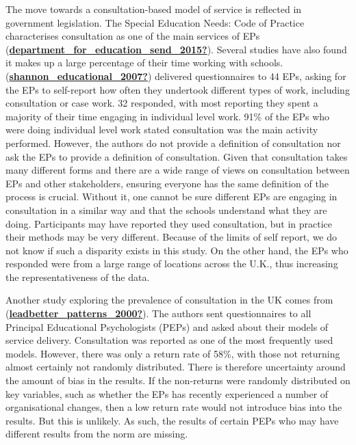 \documentclass[
]{article}
\begin{document}
The move towards a consultation-based model of service is reflected in
government legislation. The Special Education Needs: Code of Practice
characterises consultation as one of the main services of EPs
(\protect\hyperlink{ref-department_for_education_send_2015}{\textbf{department\_for\_education\_send\_2015?}}).
Several studies have also found it makes up a large percentage of their
time working with schools.
(\protect\hyperlink{ref-shannon_educational_2007}{\textbf{shannon\_educational\_2007?}})
delivered questionnaires to 44 EPs, asking for the EPs to self-report
how often they undertook different types of work, including consultation
or case work. 32 responded, with most reporting they spent a majority of
their time engaging in individual level work. 91\% of the EPs who were
doing individual level work stated consultation was the main activity
performed. However, the authors do not provide a definition of
consultation nor ask the EPs to provide a definition of consultation.
Given that consultation takes many different forms and there are a wide
range of views on consultation between EPs and other stakeholders,
ensuring everyone has the same definition of the process is crucial.
Without it, one cannot be sure different EPs are engaging in
consultation in a similar way and that the schools understand what they
are doing. Participants may have reported they used consultation, but in
practice their methods may be very different. Because of the limits of
self report, we do not know if such a disparity exists in this study. On
the other hand, the EPs who responded were from a large range of
locations across the U.K., thus increasing the representativeness of the
data.

Another study exploring the prevalence of consultation in the UK comes
from
(\protect\hyperlink{ref-leadbetter_patterns_2000}{\textbf{leadbetter\_patterns\_2000?}}).
The authors sent questionnaires to all Principal Educational
Psychologists (PEPs) and asked about their models of service delivery.
Consultation was reported as one of the most frequently used models.
However, there was only a return rate of 58\%, with those not returning
almost certainly not randomly distributed. There is therefore
uncertainty around the amount of bias in the results. If the non-returns
were randomly distributed on key variables, such as whether the EPs has
recently experienced a number of organisational changes, then a low
return rate would not introduce bias into the results. But this is
unlikely. As such, the results of certain PEPs who may have different
results from the norm are missing.
\end{document}
